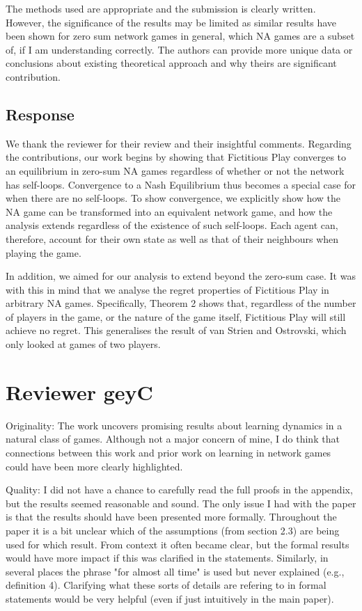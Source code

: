 \documentclass{article}
\begin{document}
	The methods used are appropriate and the submission is clearly written. However, the significance of the results may be limited as similar results have been shown for zero sum network games in general, which NA games are a subset of, if I am understanding correctly. The authors can provide more unique data or conclusions about existing theoretical approach and why theirs are significant contribution.
	
	\subsection{Response}
	
	We thank the reviewer for their review and their insightful comments. Regarding the contributions, our work begins by showing that  Fictitious Play converges to an equilibrium in zero-sum NA games regardless of whether or not the network has self-loops. Convergence to a Nash Equilibrium thus becomes a special case for when there are no self-loops. To show convergence, we explicitly show how the NA game can be transformed into an equivalent network game, and how the analysis extends regardless of the existence of such self-loops. Each agent can, therefore, account for their own state as well as that of their neighbours when playing the game.
	
	In addition, we aimed for our analysis to extend beyond the zero-sum case. It was with this in mind that we analyse the regret properties of Fictitious Play in arbitrary NA games. Specifically, Theorem 2 shows that, regardless of the number of players in the game, or the nature of the game itself, Fictitious Play will still achieve no regret. This generalises the result of van Strien and Ostrovski, which only looked at games of two players.
	
	\section{Reviewer geyC}
	
	Originality: The work uncovers promising results about learning dynamics in a natural class of games. Although not a major concern of mine, I do think that connections between this work and prior work on learning in network games could have been more clearly highlighted.
	
	Quality: I did not have a chance to carefully read the full proofs in the appendix, but the results seemed reasonable and sound. The only issue I had with the paper is that the results should have been presented more formally. Throughout the paper it is a bit unclear which of the assumptions (from section 2.3) are being used for which result. From context it often became clear, but the formal results would have more impact if this was clarified in the statements. Similarly, in several places the phrase "for almost all time" is used but never explained (e.g., definition 4). Clarifying what these sorts of details are refering to in formal statements would be very helpful (even if just intuitively in the main paper).
	
\end{document}
